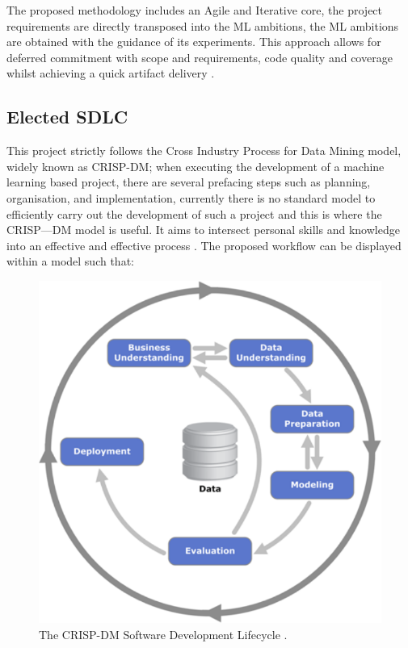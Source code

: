 The proposed methodology includes an Agile and Iterative core, the project requirements are directly transposed into the ML ambitions, the ML ambitions are obtained with the guidance of its experiments. This approach allows for deferred commitment with scope and requirements, code quality and coverage whilst achieving a quick artifact delivery \parencite{pinhasi2021mldc}.

\subsection{Elected SDLC}

This project strictly follows the Cross Industry Process for Data Mining model, widely known as CRISP-DM; when executing the development of a machine learning based project, there are several prefacing steps such as planning, organisation, and implementation, currently there is no standard model to efficiently carry out the development of such a project and this is where the CRISP---DM model is useful. It aims to intersect personal skills and knowledge into an effective and effective process \parencite{wirth2000crisp}. The proposed workflow can be displayed within a model such that:

\begin{figure}[H]
    \centering
    \includegraphics[width=\textwidth]{figures/chapter-3/CRISP-DM1.pdf}
    \caption[CRISP-DM Lifecycle]{The CRISP-DM Software Development Lifecycle \parencite{jenson2012crisp}.
    \label{fig:CRISP-DM}}
\end{figure}

